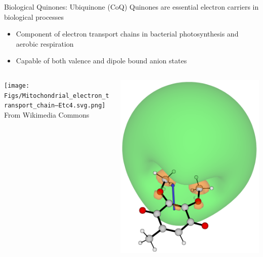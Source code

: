 \documentclass[9pt,t,xcolor=table]{beamer}
\begin{document}
\begin{frame}{\huge Biological Quinones: Ubiquinone (CoQ)}\large
	Quinones are essential electron carriers in biological processes
		\vspace{5pt}
		\begin{itemize}
		\item Component of electron transport chains in bacterial photosynthesis and aerobic respiration	
		\item Capable of both valence and dipole bound anion states
		\end{itemize}
		\begin{columns}[b]
			\begin{column}[b]{0.5\textwidth}
				\centering
				\texttt{[image: Figs/Mitochondrial\_electron\_transport\_chain—Etc4.svg.png]}\\
				\vspace{3pt}
				\small From Wikimedia Commons
			\end{column}
			\begin{column}[b]{0.25\textwidth}
				\centering
				\includegraphics[width=\textwidth]{Figs/Q0_181.png}\\

\end{column}
\end{columns}
\end{frame}
\end{document}
